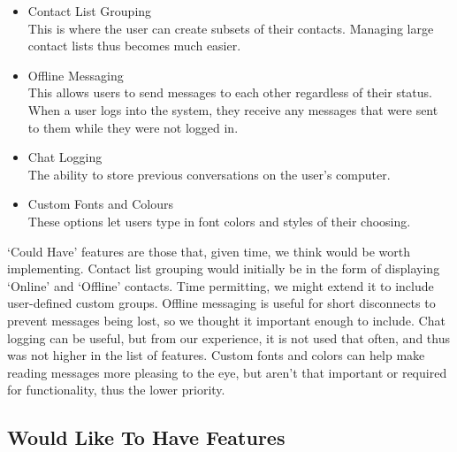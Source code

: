 \begin{itemize}
\item{Contact List Grouping\\
	This is where the user can create subsets of their contacts. Managing large contact lists thus becomes much easier.}
\item{Offline Messaging\\
	This allows users to send messages to each other regardless of their status. When a user logs into the system, they receive any messages that were sent to them while they were not logged in.}
\item{Chat Logging\\
	The ability to store previous conversations on the user's computer.}
\item{Custom Fonts and Colours\\
	These options let users type in font colors and styles of their choosing.}
\end{itemize}

`Could Have' features are those that, given time, we think would be worth implementing. Contact list grouping would initially be in the form of displaying `Online' and `Offline' contacts. Time permitting, we might extend it to include user-defined custom groups. Offline messaging is useful for short disconnects to prevent messages being lost, so we thought it important enough to include. Chat logging can be useful, but from our experience, it is not used that often, and thus was not higher in the list of features. Custom fonts and colors can help make reading messages more pleasing to the eye, but aren't that important or required for functionality, thus the lower priority.


\subsection*{Would Like To Have Features}

